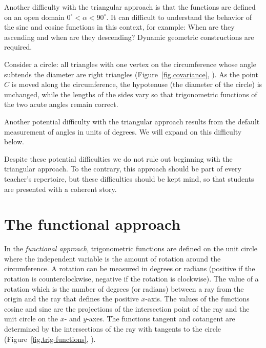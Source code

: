 Another difficulty with the triangular approach is that the functions are defined on an open domain $0^\circ<\alpha<90^\circ$.
It can difficult to understand the behavior of the sine and cosine functions in this context, for example: When are they ascending and when are they descending? Dynamic geometric constructions are required.

Consider a circle: all triangles with one vertex on the circumference whose angle subtends the diameter are right triangles (Figure~\ref{fig.covariance}, ). As the point $C$ is moved along the circumference, the hypotenuse (the diameter of the circle) is unchanged, while the lengths of the sides vary so that trigonometric functions of the two acute angles remain correct.

Another potential difficulty with the triangular approach results from the default measurement of angles in units of degrees. We will expand on this  difficulty below.

Despite these potential difficulties we do not rule out beginning with the triangular approach.
To the contrary, this approach should be part of every teacher's repertoire, but these difficulties should be kept mind, so that students are presented with a coherent story.

\section{The functional approach}

In the \emph{functional approach}, trigonometric functions are defined on the unit circle where the independent variable is the amount of rotation around the circumference.
A rotation can be measured in degrees or radians (positive if the rotation is counterclockwise, negative if the rotation is clockwise).
The value of a rotation which is the number of degrees (or radians) between a ray from the origin and the ray that defines the positive $x$-axis.
The values of the functions cosine and sine are the projections of the intersection point of the ray and the unit circle on the $x$- and $y$-axes. The functions tangent and cotangent are determined by the intersections of the ray with tangents to the circle (Figure~\ref{fig.trig-functions}, ). 

